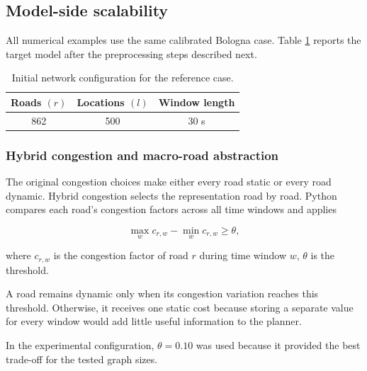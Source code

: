 \documentclass[10pt]{article}
\begin{document}
\subsection{Model-side scalability}

All numerical examples use the same calibrated Bologna case. Table \ref{tab:size-reference} reports the target
model after the preprocessing steps described next.

\begin{table}[H]
\centering
\caption{Initial network configuration for the reference case.}
\label{tab:size-reference}
\scriptsize

\begin{tabular}{@{}ccc@{}}
\toprule
Roads $(r)$ & Locations $(l)$ & Window length \\
\midrule
862 & 500 & 30 s \\
\bottomrule
\end{tabular}
\end{table}

\subsubsection{Hybrid congestion and macro-road abstraction}

The original congestion choices make either every road static or every road
dynamic. Hybrid congestion selects the representation road by road. Python
compares each road's congestion factors across all time windows and applies

\[
  \max_w c_{r,w} - \min_w c_{r,w} \geq \theta,
\]

where \(c_{r,w}\) is the congestion factor of road \(r\) during time window \(w\), \(\theta\) is the threshold.

A road remains dynamic only when its congestion variation reaches this
threshold. Otherwise, it receives one static cost because storing a separate
value for every window would add little useful information to the planner.

In the experimental configuration, \(\theta=0.10\) was used because
it provided the best trade-off for the tested graph sizes.
\end{document}
